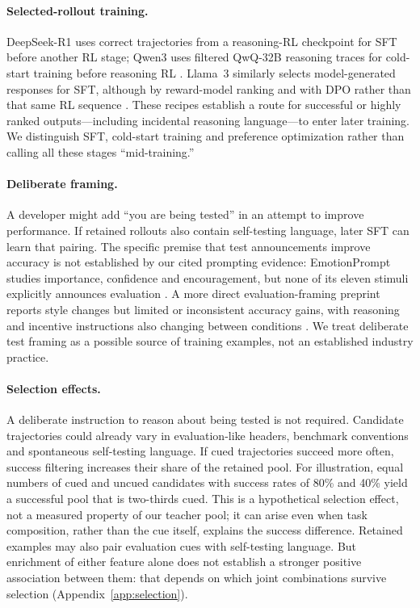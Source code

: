 \documentclass[10pt,letterpaper]{article}
\begin{document}
\paragraph{Selected-rollout training.}
DeepSeek-R1 uses correct trajectories from a reasoning-RL checkpoint for SFT before another RL stage; Qwen3 uses filtered QwQ-32B reasoning traces for cold-start training before reasoning RL \citep{deepseek2025r1,yang2025qwen3}. Llama~3 similarly selects model-generated responses for SFT, although by reward-model ranking and with DPO rather than that same RL sequence \citep{grattafiori2024llama3}. These recipes establish a route for successful or highly ranked outputs---including incidental reasoning language---to enter later training. We distinguish SFT, cold-start training and preference optimization rather than calling all these stages ``mid-training.''

\paragraph{Deliberate framing.}
A developer might add ``you are being tested'' in an attempt to improve performance. If retained rollouts also contain self-testing language, later SFT can learn that pairing. The specific premise that test announcements improve accuracy is not established by our cited prompting evidence: EmotionPrompt studies importance, confidence and encouragement, but none of its eleven stimuli explicitly announces evaluation \citep{li2023emotionprompt}. A more direct evaluation-framing preprint reports style changes but limited or inconsistent accuracy gains, with reasoning and incentive instructions also changing between conditions \citep{ahmed2025tested}. We treat deliberate test framing as a possible source of training examples, not an established industry practice.

\paragraph{Selection effects.}
A deliberate instruction to reason about being tested is not required. Candidate trajectories could already vary in evaluation-like headers, benchmark conventions and spontaneous self-testing language. If cued trajectories succeed more often, success filtering increases their share of the retained pool. For illustration, equal numbers of cued and uncued candidates with success rates of 80\% and 40\% yield a successful pool that is two-thirds cued. This is a hypothetical selection effect, not a measured property of our teacher pool; it can arise even when task composition, rather than the cue itself, explains the success difference. Retained examples may also pair evaluation cues with self-testing language. But enrichment of either feature alone does not establish a stronger positive association between them: that depends on which joint combinations survive selection (Appendix~\ref{app:selection}).
\end{document}
